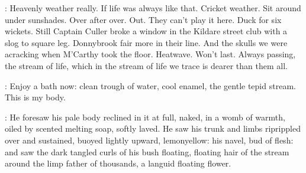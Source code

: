 \BloomInt:
Heavenly weather really.
If life was always like that.
Cricket weather.
Sit around under sunshades.
Over after over.
Out.
They can't play it here.
Duck for six wickets.
Still Captain Culler broke a window in the Kildare street club
with a slog to square leg.
Donnybrook fair more in their line.
And the skulls we were acracking when M'Carthy took the floor.
Heatwave.
Won't last.
Always passing,
the stream of life,
which in the stream of life we trace
is dearer than them all.

\BloomInt:
Enjoy a bath now:
clean trough of water,
cool enamel,
the gentle tepid stream.
This is my body.

:
He foresaw his pale body reclined in it at full,
naked,
in a womb of warmth,
oiled by scented melting soap,
softly laved.
He saw his trunk and limbs riprippled over
and sustained,
buoyed lightly upward,
lemonyellow:
his navel, bud of flesh:
and saw the dark tangled curls of his bush
floating,
floating hair of the stream
around the limp father of thousands,
a languid floating flower.
